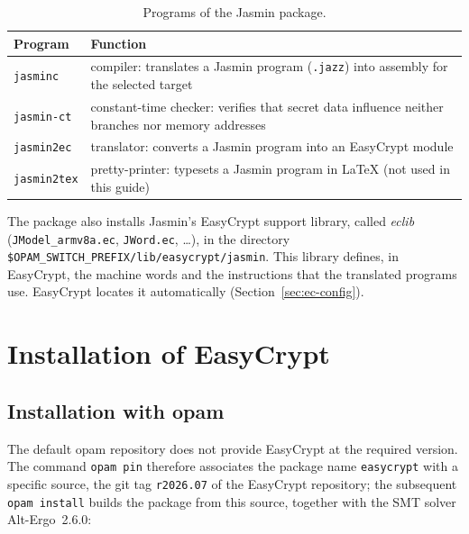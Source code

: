 \documentclass[11pt,a4paper]{article}
\newcommand{\file}[1]{\texttt{#1}}
\begin{document}
\begin{table}[h]
\centering\small
\begin{tabularx}{\textwidth}{@{}lX@{}}
\toprule
\textbf{Program} & \textbf{Function} \\
\midrule
\texttt{jasminc} & compiler: translates a Jasmin program (\texttt{.jazz}) into assembly for the selected target \\
\texttt{jasmin-ct} & constant-time checker: verifies that secret data influence neither branches nor memory addresses \\
\texttt{jasmin2ec} & translator: converts a Jasmin program into an EasyCrypt module \\
\texttt{jasmin2tex} & pretty-printer: typesets a Jasmin program in \LaTeX{} (not used in this guide) \\
\bottomrule
\end{tabularx}
\caption{Programs of the Jasmin package.}
\label{tab:jasmintools}
\end{table}

The package also installs Jasmin's EasyCrypt support library, called
\emph{eclib} (\file{JModel\_armv8a.ec}, \file{JWord.ec}, \dots), in the
directory \file{\$OPAM\_SWITCH\_PREFIX/lib/easycrypt/jasmin}. This library
defines, in EasyCrypt, the machine words and the instructions that the
translated programs use. EasyCrypt locates it automatically
(Section~\ref{sec:ec-config}).

\section{Installation of EasyCrypt}
\label{sec:easycrypt}

\subsection{Installation with opam}

The default opam repository does not provide EasyCrypt at the required
version. The command \texttt{opam pin} therefore associates the package name
\texttt{easycrypt} with a specific source, the git tag \texttt{r2026.07} of
the EasyCrypt repository; the subsequent \texttt{opam install} builds the
package from this source, together with the SMT solver Alt-Ergo~2.6.0:
\end{document}
